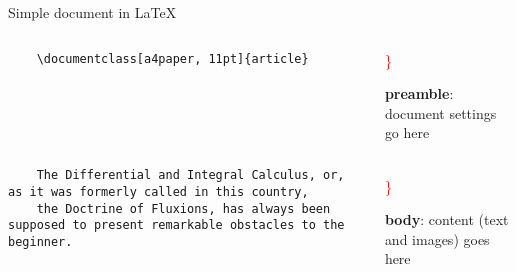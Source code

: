 

\begin{frame}[fragile]{Simple document in \LaTeX}
	\begin{columns}
        \begin{column}{0.3\textwidth}
	\begin{verbatim} 
	\documentclass[a4paper, 11pt]{article}


		
		
	

	The Differential and Integral Calculus, or, as it was formerly called in this country, 
	the Doctrine of Fluxions, has always been supposed to present remarkable obstacles to the beginner.
	
	
	
	\end{verbatim}
\end{column}
\begin{column}{0.6\textwidth}
	{\Huge \textcolor{red}{ \} } } \begin{minipage}{7cm}\textbf{preamble}: document settings go here\end{minipage}\\[2cm]
	{\Huge \textcolor{red}{ \} } } \begin{minipage}{7cm}\textbf{body}: content (text and images) goes here\end{minipage}\\[2cm]
\end{column}
\end{columns}

\end{frame}
